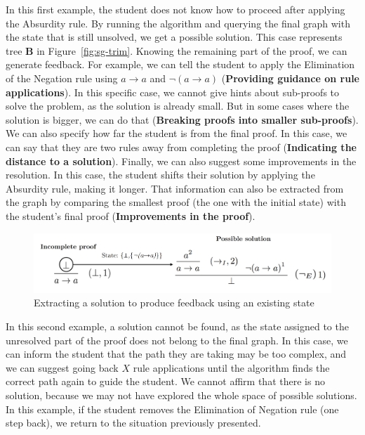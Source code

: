 \documentclass[runningheads]{llncs}
\begin{document}
In this first example, the student does not know how to proceed after applying the Absurdity rule. By running the algorithm and querying the final graph with the state that is still unsolved, we get a possible solution. This case represents tree \textbf{B} in Figure~\ref{fig:sg-trim}. Knowing the remaining part of the proof, we can generate feedback. For example, we can tell the student to apply the Elimination of the Negation rule using \(a \to a \) and  \(\lnot(a \to a) \) (\textbf{Providing guidance on rule applications}). In this specific case, we cannot give hints about sub-proofs to solve the problem, as the solution is already small. But in some cases where the solution is bigger, we can do that (\textbf{Breaking proofs into smaller sub-proofs}). We can also specify how far the student is from the final proof. In this case, we can say that they are two rules away from completing the proof (\textbf{Indicating the distance to a solution}). Finally, we can also suggest some improvements in the resolution. In this case, the student shifts their solution by applying the Absurdity rule, making it longer. That information can also be extracted from the graph by comparing the smallest proof (the one with the initial state) with the student’s final proof (\textbf{Improvements in the proof}).

 
\begin{figure}
    \centering
    \includegraphics[width=1\linewidth]{resources/trim-pos-feed.jpg}
    \caption{Extracting a solution to produce feedback using an existing state}
    \label{fig:extract-solution}
\end{figure}

In this second example, a solution cannot be found, as the state assigned to the unresolved part of the proof does not belong to the final graph. In this case, we can inform the student that the path they are taking may be too complex, and we can suggest going back \(X\) rule applications until the algorithm finds the correct path again to guide the student. We cannot affirm that there is no solution, because we may not have explored the whole space of possible solutions. In this example, if the student removes the Elimination of Negation rule (one step back), we return to the situation previously presented.
\end{document}
